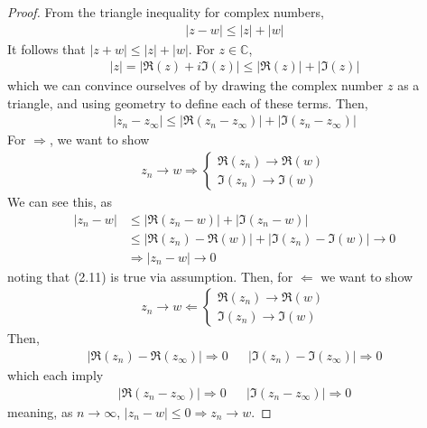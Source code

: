 \begin{proof}
    From the triangle inequality for complex numbers,
    \begin{align}
        |z-w| \le |z|+|w|
    \end{align}
    It follows that $|z+w| \le |z|+|w|$. For $z\in\mathbb{C}$,
    \begin{align}
        |z|=|\Re(z)+i\Im(z)| \leq |\Re(z)|+|\Im(z)|
    \end{align}
    which we can convince ourselves of by drawing the complex number $z$ as a triangle, and using geometry to define each of these terms. Then,
    \begin{align}
        |z_n-z_\infty| \leq |\Re(z_n-z_\infty)|+|\Im(z_n-z_\infty)|
    \end{align}
    For $\Rightarrow$, we want to show
    \begin{align}
        z_n \to w \Rightarrow \begin{cases}
        \Re(z_n) \to \Re(w)\\
        \Im(z_n) \to \Im(w)
        \end{cases}
    \end{align}
    We can see this, as
    \begin{align}
        |z_n - w| &\le |\Re(z_n - w)| + |\Im(z_n - w)|\\
        &\le |\Re(z_n) - \Re(w)| + |\Im(z_n) - \Im(w)| \to 0\\
        &\Rightarrow |z_n - w| \to 0
    \end{align}
    noting that (2.11) is true via assumption. Then, for $\Leftarrow$ we want to show
    \begin{align}
        z_n \to w \Leftarrow \begin{cases}
        \Re(z_n) \to \Re(w)\\
        \Im(z_n) \to \Im(w)
        \end{cases}
    \end{align}
    Then,
    \begin{align}
        |\Re(z_n)-\Re(z_\infty)| \Rightarrow 0 && |\Im(z_n)-\Im(z_\infty)| \Rightarrow 0
    \end{align}
    which each imply
    \begin{align}
        |\Re(z_n-z_\infty)| \Rightarrow 0 && |\Im(z_n-z_\infty)| \Rightarrow 0
    \end{align}
    meaning, as $n \to \infty$, $|z_n - w| \le 0 \Rightarrow z_n \to w$.
\end{proof}


